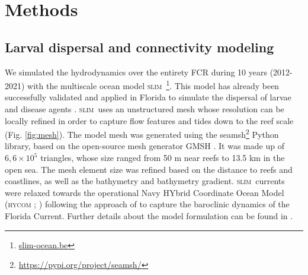\documentclass[preprint,12pt,authoryear]{elsarticle}
\newcommand{\hycom}{\textsc{hycom} }
\newcommand{\slim}{\textsc{slim}\ }
\begin{document}

\section*{Methods}

\subsection*{Larval dispersal and connectivity modeling}

We simulated the hydrodynamics over the entirety FCR during 10 years (2012-2021) with the multiscale ocean model \slim\footnote{\href{ https://www.slim-ocean.be}{slim-ocean.be}}. This model has already been successfully validated and applied in Florida to simulate the dispersal of larvae and disease agents \citep{frys2020fine,dobbelaere2020coupled}. \slim uses an unstructured mesh whose resolution can be locally refined in order to capture flow features and tides down to the reef scale (Fig. \ref{fig:mesh}). The model mesh was generated using the seamsh\footnote{\href{https://pypi.org/project/seamsh/}{https://pypi.org/project/seamsh/}} Python library, based on the open-source mesh generator GMSH \citep{geuzaine2009gmsh}. It was made up of $6,6\times 10^5$ triangles, whose size ranged from 50 m near reefs to 13.5 km in the open sea. The mesh element size was refined based on the distance to reefs and coastlines, as well as the bathymetry and bathymetry gradient. \slim currents were relaxed towards the operational Navy HYbrid Coordinate Ocean Model (\hycom; \citealp{chassignet2007hycom}) following the approach of \citep{dobbelaere2022impacts} to capture the baroclinic dynamics of the Florida Current. Further details about the model formulation can be found in \citep{frys2020fine}.
\end{document}
